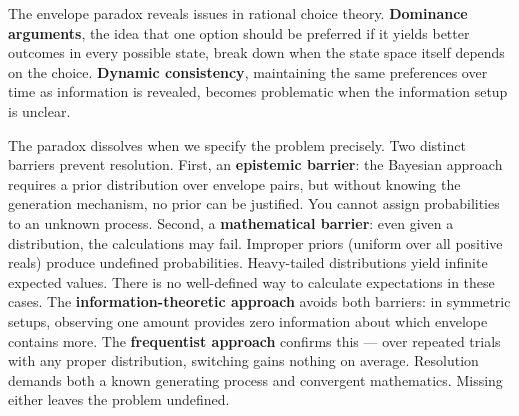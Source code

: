 The envelope paradox reveals issues in rational choice theory. \textbf{Dominance arguments}, the idea that one option should be preferred if it yields better outcomes in every possible state, break down when the state space itself depends on the choice. \textbf{Dynamic consistency}, maintaining the same preferences over time as information is revealed, becomes problematic when the information setup is unclear.

The paradox dissolves when we specify the problem precisely. Two distinct barriers prevent resolution. First, an \textbf{epistemic barrier}: the Bayesian approach requires a prior distribution over envelope pairs, but without knowing the generation mechanism, no prior can be justified. You cannot assign probabilities to an unknown process. Second, a \textbf{mathematical barrier}: even given a distribution, the calculations may fail. Improper priors (uniform over all positive reals) produce undefined probabilities. Heavy-tailed distributions yield infinite expected values. There is no well-defined way to calculate expectations in these cases. The \textbf{information-theoretic approach} avoids both barriers: in symmetric setups, observing one amount provides zero information about which envelope contains more. The \textbf{frequentist approach} confirms this — over repeated trials with any proper distribution, switching gains nothing on average. Resolution demands both a known generating process and convergent mathematics. Missing either leaves the problem undefined.

